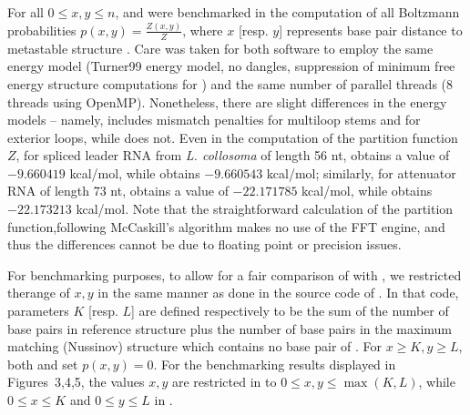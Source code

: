 For all $0 \leq x,y \leq n$, \rnatwofold and \ffttwo were
benchmarked in the computation of all Boltzmann probabilities
$p(x,y)= \frac{Z(x,y)}{Z}$, where $x$ [resp. $y$] represents base pair
distance to metastable structure . Care was taken for
both software to employ the same energy model (Turner99 energy model,
no dangles, suppression of minimum free energy structure computations
for \rnatwofold) and the same number of parallel threads (8 threads
using OpenMP). Nonetheless, there are slight differences in the energy
models -- namely, \rnatwofold includes
mismatch penalties for multiloop stems and for exterior loops, while
\ffttwo does not. Even in the computation of the partition function
$Z$, for spliced leader RNA from {\em L. collosoma} of length 56 nt,
 obtains a value of
$-9.660419$ kcal/mol, while \ffttwo obtains
$-9.660543$ kcal/mol; similarly, for attenuator RNA of length 73 nt,
 obtains a value of
$-22.171785$ kcal/mol, while \ffttwo obtains
$-22.173213$ kcal/mol.
Note that the straightforward calculation of the partition function,following McCaskill's algorithm \cite{mcCaskill}makes no use of the FFT engine, and thus the
differences cannot be due to floating point or precision issues.

For benchmarking purposes,
to allow for a fair comparison of \ffttwo
with \rnatwofold, we restricted therange of $x,y$ in the same manner as done in the source code of \rnatwofold.
In that code, parameters $K$ [resp. $L$] are defined respectively to be the
sum of the number of base pairs in reference structure  plus the number of base pairs in
the maximum matching (Nussinov) structure which contains
no base pair of .
For $x \geq K, y \geq L$, both \rnatwofold and \ffttwo
set $p(x,y)=0$.  For the benchmarking results displayed in
Figures~3,4,5, the values $x,y$ are restricted in
\ffttwo to $0 \leq x,y \leq \max(K,L)$, while $0 \leq x \leq K$
and $0 \leq y \leq L$ in \rnatwofold.

